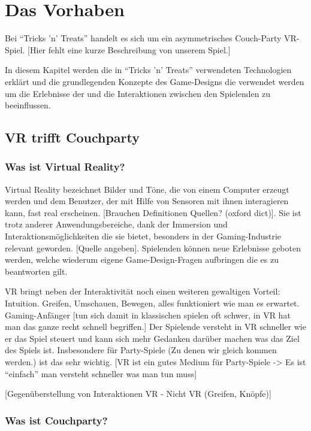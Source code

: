 \chapter{Das Vorhaben}
\label{cha:sa_Einleitung}

Bei "`Tricks 'n' Treats"' handelt es sich um ein asymmetrisches Couch-Party VR-Spiel. [Hier fehlt eine kurze Beschreibung von unserem Spiel.]

In diesem Kapitel werden die in "`Tricks 'n' Treats"' verwendeten Technologien erklärt und die grundlegenden Konzepte des Game-Designs die verwendet werden um die  Erlebnisse der und die Interaktionen zwischen den Spielenden zu beeinflussen.

\section{VR trifft Couchparty}

\subsection{Was ist Virtual Reality?}

Virtual Reality bezeichnet Bilder und Töne, die von einem Computer erzeugt werden und dem Benutzer, der mit Hilfe von Sensoren mit ihnen interagieren kann, fast real erscheinen. [Brauchen Definitionen Quellen? (oxford dict)]. Sie ist trotz anderer Anwendungsbereiche, dank der Immersion und Interaktionsmöglichkeiten die sie bietet, besonders in der Gaming-Industrie relevant geworden. [Quelle angeben]. Spielenden können neue Erlebnisse geboten werden, welche wiederum eigene  Game-Design-Fragen aufbringen die es zu beantworten gilt.

VR bringt neben der Interaktivität noch einen weiteren gewaltigen Vorteil: Intuition. Greifen, Umschauen, Bewegen, alles funktioniert wie man es erwartet. Gaming-Anfänger [tun sich damit in klassischen spielen oft schwer, in VR hat man das ganze recht schnell begriffen.] Der Spielende versteht in VR schneller wie er das Spiel steuert und kann sich mehr Gedanken darüber machen was das Ziel des Spiels ist. Insbesondere für Party-Spiele (Zu denen wir gleich kommen werden.) ist das sehr wichtig. [VR ist ein gutes Medium für Party-Spiele -> Es ist "`einfach"' man versteht schneller was man tun muss]

[Gegenüberstellung von Interaktionen VR - Nicht VR (Greifen, Knöpfe)]

\subsection{Was ist Couchparty?}

